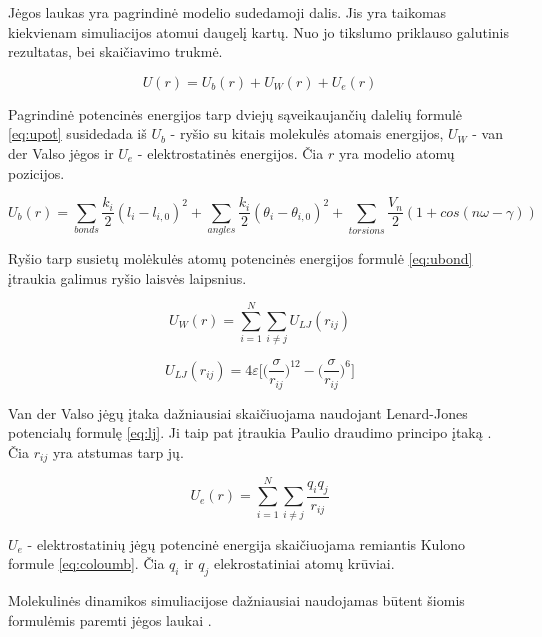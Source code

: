 Jėgos laukas yra pagrindinė modelio sudedamoji dalis.
Jis yra taikomas kiekvienam simuliacijos atomui daugelį kartų.
Nuo jo tikslumo priklauso galutinis rezultatas, bei skaičiavimo trukmė.


\begin{equation} \label{eq:upot}
    U(r) = U_b(r) + U_W(r) + U_e(r)
\end{equation}


Pagrindinė potencinės energijos tarp dviejų sąveikaujančių dalelių formulė \ref{eq:upot} susidedada iš
\(U_b\) - ryšio su kitais molekulės atomais energijos, \(U_W\) - van der Valso jėgos ir \(U_e\) - elektrostatinės  energijos.
Čia \(r\) yra modelio atomų pozicijos.

\begin{equation} \label{eq:ubond}
U_b(r) = \sum\limits_{bonds}{\dfrac {k_i} {2} (l_i - l_{i,0})^2} + \sum\limits_{angles}{\dfrac {k_i} {2} (\theta_i - \theta_{i,0})^2} + \sum\limits_{torsions}{\dfrac {V_n} {2} (1 + cos(n\omega - \gamma))}
\end{equation}

Ryšio tarp susietų molėkulės atomų potencinės energijos formulė \ref{eq:ubond} įtraukia galimus ryšio laisvės laipsnius.


\begin{equation} \label{eq:uw}
U_W(r) = \sum\limits_{i=1}^N \sum\limits_{i\neq j} {U_{LJ}(r_{ij})}
\end{equation}

\begin{equation} \label{eq:lj}
    U_{LJ}(r_{ij}) = 4\varepsilon\Bigg[\bigg(\dfrac \sigma {r_{ij}}\bigg)^{12} - \bigg(\dfrac \sigma {r_{ij}}\bigg)^6\Bigg]
\end{equation}

Van der Valso jėgų įtaka dažniausiai skaičiuojama naudojant Lenard-Jones potencialų formulę \ref{eq:lj}.
Ji taip pat įtraukia Paulio draudimo principo įtaką \cite{molmod}.
Čia \(r_{ij}\) yra atstumas tarp jų.

\begin{equation} \label{eq:coloumb}
    U_{e}(r) = \sum\limits_{i=1}^N \sum\limits_{i\neq j} {\dfrac{q_i q_j}{r_{ij}}}
\end{equation}

\(U_e\) - elektrostatinių jėgų potencinė energija skaičiuojama remiantis Kulono formule \ref{eq:coloumb}.
Čia \(q_i\) ir \(q_j\) elekrostatiniai atomų krūviai.

Molekulinės dinamikos simuliacijose dažniausiai naudojamas būtent šiomis formulėmis paremti jėgos laukai \cite{polar}.

